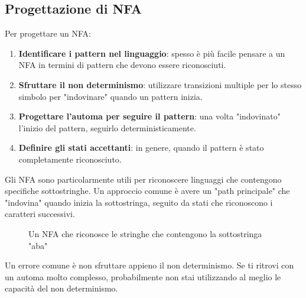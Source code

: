 \documentclass[12pt,a4paper]{article}
\begin{document}
\subsection{Progettazione di NFA}

\begin{risoluzione}
Per progettare un NFA:

\begin{enumerate}
  \item \textbf{Identificare i pattern nel linguaggio}: spesso è più facile pensare a un NFA in termini di pattern che devono essere riconosciuti.
  \item \textbf{Sfruttare il non determinismo}: utilizzare transizioni multiple per lo stesso simbolo per "indovinare" quando un pattern inizia.
  \item \textbf{Progettare l'automa per seguire il pattern}: una volta "indovinato" l'inizio del pattern, seguirlo deterministicamente.
  \item \textbf{Definire gli stati accettanti}: in genere, quando il pattern è stato completamente riconosciuto.
\end{enumerate}
\end{risoluzione}

\begin{suggerimento}
Gli NFA sono particolarmente utili per riconoscere linguaggi che contengono specifiche sottostringhe. Un approccio comune è avere un "path principale" che "indovina" quando inizia la sottostringa, seguito da stati che riconoscono i caratteri successivi.
\end{suggerimento}

\begin{figure}[h]
\centering
{}
\caption{Un NFA che riconosce le stringhe che contengono la sottostringa "aba"}
\end{figure}

\begin{errorecomune}
Un errore comune è non sfruttare appieno il non determinismo. Se ti ritrovi con un automa molto complesso, probabilmente non stai utilizzando al meglio le capacità del non determinismo.
\end{errorecomune}
\end{document}
